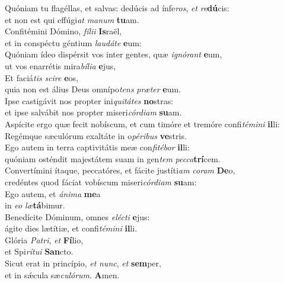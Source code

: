 \evenverse Quóniam tu flagéllas, et salvas: dedúcis ad ínfe\textit{ros}, \textit{et} \textit{re}\textbf{dú}cis:~\*\\
\evenverse et non est qui effúgi\textit{at} \textit{ma}\textit{num} \textbf{tu}am.\\
\oddverse Confitémini Dómino, \textit{fí}\textit{li}\textit{i} \textbf{Is}raël,~\*\\
\oddverse et in conspéctu géntium \textit{lau}\textit{dá}\textit{te} \textbf{e}um:\\
\evenverse Quóniam ídeo dispérsit vos inter gentes, quæ \textit{i}\textit{gnó}\textit{rant} \textbf{e}um,~\*\\
\evenverse ut vos enarrétis mira\textit{bí}\textit{li}\textit{a} \textbf{e}jus,\\
\oddverse Et faciá\textit{tis} \textit{sci}\textit{re} \textbf{e}os,~\*\\
\oddverse quia non est álius Deus omnípo\textit{tens} \textit{præ}\textit{ter} \textbf{e}um.\\
\evenverse Ipse castigávit nos propter ini\textit{qui}\textit{tá}\textit{tes} \textbf{no}stras:~\*\\
\evenverse et ipse salvábit nos propter miseri\textit{cór}\textit{di}\textit{am} \textbf{su}am.\\
\oddverse Aspícite ergo quæ fecit nobíscum, et cum timóre et tremóre confi\textit{té}\textit{mi}\textit{ni} \textbf{il}li:~\*\\
\oddverse Regémque sæculórum exaltáte in o\textit{pé}\textit{ri}\textit{bus} \textbf{ve}stris.\\
\evenverse Ego autem in terra captivitátis meæ con\textit{fi}\textit{té}\textit{bor} \textbf{il}li:~\*\\
\evenverse quóniam osténdit majestátem suam in gen\textit{tem} \textit{pec}\textit{ca}\textbf{trí}cem.\\
\oddverse Convertímini ítaque, peccatóres, et fácite justíti\textit{am} \textit{co}\textit{ram} \textbf{De}o,~\*\\
\oddverse credéntes quod fáciat vobíscum miseri\textit{cór}\textit{di}\textit{am} \textbf{su}am:\\
\evenverse Ego autem, et \textit{á}\textit{ni}\textit{ma} \textbf{me}a~\*\\
\evenverse in \textit{e}\textit{o} \textit{læ}\textbf{tá}bimur.\\
\oddverse Benedícite Dóminum, omnes \textit{e}\textit{lé}\textit{cti} \textbf{e}jus:~\*\\
\oddverse ágite dies lætítiæ, et confi\textit{té}\textit{mi}\textit{ni} \textbf{il}li.\\
\evenverse Glória \textit{Pa}\textit{tri}, \textit{et} \textbf{Fí}lio,~\*\\
\evenverse et Spi\textit{rí}\textit{tu}\textit{i} \textbf{San}cto.\\
\oddverse Sicut erat in princípio, \textit{et} \textit{nunc}, \textit{et} \textbf{sem}per,~\*\\
\oddverse et in sǽcula sæ\textit{cu}\textit{ló}\textit{rum}. \textbf{A}men.\\
